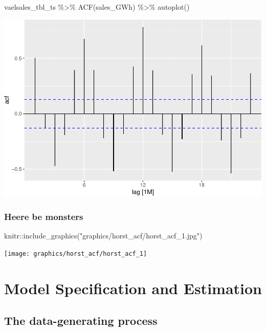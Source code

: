 \documentclass[
]{book}
\newenvironment{Shaded}{\begin{snugshade}}{\end{snugshade}}
\newcommand{\FunctionTok}[1]{\textcolor[rgb]{0.00,0.00,0.00}{#1}}
\newcommand{\NormalTok}[1]{#1}
\newcommand{\SpecialCharTok}[1]{\textcolor[rgb]{0.00,0.00,0.00}{#1}}
\newcommand{\StringTok}[1]{\textcolor[rgb]{0.31,0.60,0.02}{#1}}
\begin{document}
\begin{Shaded}
\begin{Highlighting}[]
\NormalTok{vaelsales\_tbl\_ts }\SpecialCharTok{\%\textgreater{}\%} \FunctionTok{ACF}\NormalTok{(sales\_GWh) }\SpecialCharTok{\%\textgreater{}\%} \FunctionTok{autoplot}\NormalTok{()}
\end{Highlighting}
\end{Shaded}

\includegraphics{graphics/unnamed-chunk-52-1.pdf}

\hypertarget{heere-be-monsters}{%
\section{Heere be monsters}\label{heere-be-monsters}}

\begin{Shaded}
\begin{Highlighting}[]
\NormalTok{knitr}\SpecialCharTok{::}\FunctionTok{include\_graphics}\NormalTok{(}\StringTok{"graphics/horst\_acf/horst\_acf\_1.jpg"}\NormalTok{)}
\end{Highlighting}
\end{Shaded}

\texttt{[image: graphics/horst\_acf/horst\_acf\_1]}

\hypertarget{part-model-specification-and-estimation}{%
\part{Model Specification and Estimation}\label{part-model-specification-and-estimation}}

\hypertarget{the-data-generating-process}{%
\chapter{The data-generating process}\label{the-data-generating-process}}
\end{document}

